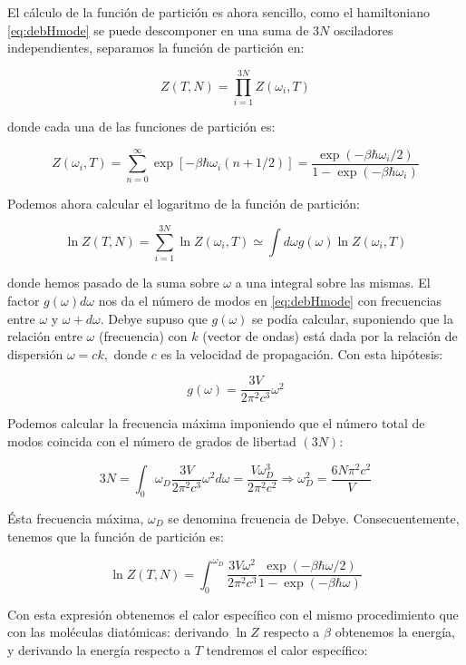 \documentclass[11pt, a4paper]{article} %
\theoremstyle{named}
\begin{document}
            El cálculo de la función de partición es ahora sencillo, como el hamiltoniano \eqref{eq:debHmode} se puede descomponer en una suma de $3N$ osciladores independientes, separamos la función de partición en:

            $$
            Z(T, N)=\prod_{i=1}^{3 N} Z\left(\omega_{i}, T\right)
            $$

            donde cada una de las funciones de partición es:

            $$
            Z\left(\omega_{i}, T\right)=\sum_{n=0}^{\infty} \exp \left[-\beta \hbar \omega_{i}(n+1 / 2)\right]=\frac{\exp \left(-\beta \hbar \omega_{i} / 2\right)}{1-\exp \left(-\beta \hbar \omega_{i}\right)}
            $$

            Podemos ahora calcular el logaritmo de la función de partición:

            $$
            \ln Z(T, N)=\sum_{i=1}^{3 N} \ln Z\left(\omega_{i}, T\right) \simeq \int d \omega g(\omega) \ln Z\left(\omega_{i}, T\right)
            $$

            donde hemos pasado de la suma sobre $\omega$ a una integral sobre las mismas. El factor $g(\omega) d \omega$ nos da el número de modos en \eqref{eq:debHmode} con frecuencias entre $\omega$ y $\omega+d \omega$. Debye supuso que $g(\omega)$ se podía calcular, suponiendo que la relación entre $\omega$ (frecuencia) con $k$ (vector de ondas) está dada por la relación de dispersión $\omega=c k,$ donde $c$ es la velocidad de propagación. Con esta hipótesis:

            $$
            g(\omega)=\frac{3 V}{2 \pi^{2} c^{3}} \omega^{2}
            $$

            Podemos calcular la frecuencia máxima imponiendo que el número total de modos coincida con el número de grados de libertad $(3 N)$:

            $$
            3 N=\int_{0} \omega_{D} \frac{3 V}{2 \pi^{2} c^{3}} \omega^{2} d \omega=\frac{V \omega_{D}^{3}}{2 \pi^{2} c^{2}} \Rightarrow \omega_{D}^{2}=\frac{6 N \pi^{2} c^{2}}{V}
            $$

            Ésta frecuencia máxima, $\omega_{D}$ se denomina frcuencia de Debye. Consecuentemente, tenemos que la función de partición es:

            $$
            \ln Z(T, N)=\int_{0}^{\omega_{D}} \frac{3 V \omega^{2}}{2 \pi^{2} c^{3}} \frac{\exp (-\beta \hbar \omega / 2)}{1-\exp (-\beta \hbar \omega)}
            $$

            Con esta expresión obtenemos el calor específico con el mismo procedimiento que con las moléculas diatómicas: derivando $\ln Z$ respecto a $\beta$ obtenemos la energía, y derivando la energía respecto a $T$ tendremos el calor específico:
\end{document}
